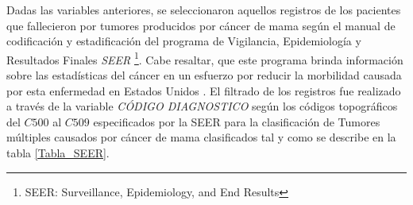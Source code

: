 Dadas las variables anteriores, se seleccionaron aquellos registros de los pacientes que fallecieron por tumores producidos por cáncer de mama según el manual de codificación y estadificación del programa de Vigilancia, Epidemiología y Resultados Finales \textit{SEER} \footnote{SEER: Surveillance, Epidemiology, and End Results}. Cabe resaltar, que este programa brinda información sobre las estadísticas del cáncer en un esfuerzo por reducir la morbilidad causada por esta enfermedad en Estados Unidos \cite{SEER2022}. El filtrado de los registros fue realizado a través de la variable \textit{CÓDIGO DIAGNOSTICO} según los códigos topográficos del $C500$ al $C509$ especificados por la SEER para la clasificación de Tumores múltiples causados por cáncer de mama clasificados tal y como se describe en la tabla \ref{Tabla_SEER}. 

